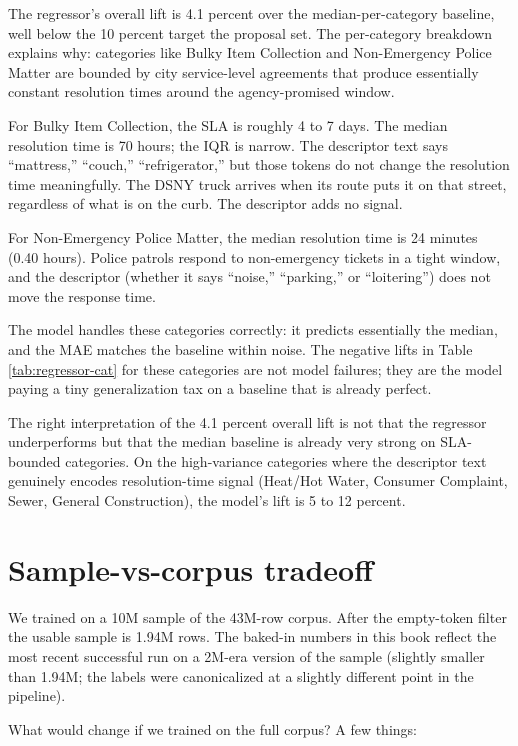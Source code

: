 \documentclass[11pt,letterpaper]{book}
\begin{document}
The regressor's overall lift is 4.1 percent over the median-per-category baseline, well below the 10 percent target the proposal set. The per-category breakdown explains why: categories like Bulky Item Collection and Non-Emergency Police Matter are bounded by city service-level agreements that produce essentially constant resolution times around the agency-promised window.

For Bulky Item Collection, the SLA is roughly 4 to 7 days. The median resolution time is 70 hours; the IQR is narrow. The descriptor text says ``mattress,'' ``couch,'' ``refrigerator,'' but those tokens do not change the resolution time meaningfully. The DSNY truck arrives when its route puts it on that street, regardless of what is on the curb. The descriptor adds no signal.

For Non-Emergency Police Matter, the median resolution time is 24 minutes (0.40 hours). Police patrols respond to non-emergency tickets in a tight window, and the descriptor (whether it says ``noise,'' ``parking,'' or ``loitering'') does not move the response time.

The model handles these categories correctly: it predicts essentially the median, and the MAE matches the baseline within noise. The negative lifts in Table \ref{tab:regressor-cat} for these categories are not model failures; they are the model paying a tiny generalization tax on a baseline that is already perfect.

The right interpretation of the 4.1 percent overall lift is not that the regressor underperforms but that the median baseline is already very strong on SLA-bounded categories. On the high-variance categories where the descriptor text genuinely encodes resolution-time signal (Heat/Hot Water, Consumer Complaint, Sewer, General Construction), the model's lift is 5 to 12 percent.

\section{Sample-vs-corpus tradeoff}

We trained on a 10M sample of the 43M-row corpus. After the empty-token filter the usable sample is 1.94M rows. The baked-in numbers in this book reflect the most recent successful run on a 2M-era version of the sample (slightly smaller than 1.94M; the labels were canonicalized at a slightly different point in the pipeline).

What would change if we trained on the full corpus? A few things:
\end{document}
